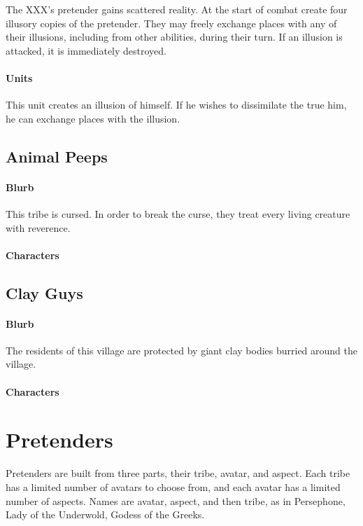 \documentclass[12pt,letterpaper]{article}
\begin{document}
The XXX's pretender gains scattered reality.
At the start of combat create four illusory copies of the pretender.
They may freely exchange places with any of their illusions,
including from other abilities, during their turn.
If an illusion is attacked, it is immediately destroyed.

\paragraph{Units}

This unit creates an illusion of himself.
If he wishes to dissimilate the true him,
he can exchange places with the illusion.

\subsection{Animal Peeps}
\paragraph{Blurb}

This tribe is cursed.
In order to break the curse,
they treat every living creature with reverence.

\paragraph{Characters}

\subsection{Clay Guys}
\paragraph{Blurb}

The residents of this village are protected by
giant clay bodies burried around the village.

\paragraph{Characters}

\section{Pretenders}

Pretenders are built from three parts,
their tribe, avatar, and aspect.
Each tribe has a limited number of avatars to choose from,
and each avatar has a limited number of aspects.
Names are avatar, aspect, and then tribe,
as in Persephone, Lady of the Underwold, Godess of the Greeks.
\end{document}
